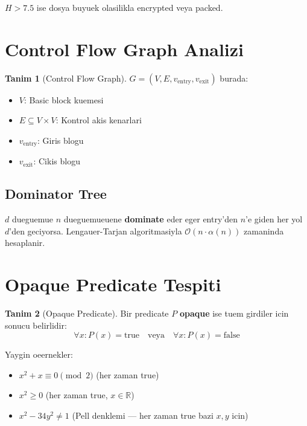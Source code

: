 \documentclass[12pt,a4paper,oneside]{book}
\theoremstyle{definition}
\newtheorem{definition}{Tanim}[chapter]
\newcommand{\bigO}[1]{\mathcal{O}\!\left(#1\right)}
\begin{document}
$H > 7.5$ ise dosya buyuek olasilikla encrypted veya packed.

\section{Control Flow Graph Analizi}
\label{sec:cfg}

\begin{definition}[Control Flow Graph]
$G = (V, E, v_{\text{entry}}, v_{\text{exit}})$ burada:
\begin{itemize}
\item $V$: Basic block kuemesi
\item $E \subseteq V \times V$: Kontrol akis kenarlari
\item $v_{\text{entry}}$: Giris blogu
\item $v_{\text{exit}}$: Cikis blogu
\end{itemize}
\end{definition}

\subsection{Dominator Tree}

$d$ dueguemue $n$ dueguemueuene \textbf{dominate} eder eger entry'den $n$'e giden her yol $d$'den geciyorsa. Lengauer-Tarjan algoritmasiyla $\bigO{n \cdot \alpha(n)}$ zamaninda hesaplanir.

\section{Opaque Predicate Tespiti}
\label{sec:opaque}

\begin{definition}[Opaque Predicate]
Bir predicate $P$ \textbf{opaque} ise tuem girdi\-ler icin sonucu belirlidir:
\begin{equation}
\forall x: P(x) = \text{true} \quad \text{veya} \quad \forall x: P(x) = \text{false}
\end{equation}
\end{definition}

Yaygin oeernekler:
\begin{itemize}
\item $x^2 + x \equiv 0 \pmod{2}$ (her zaman true)
\item $x^2 \geq 0$ (her zaman true, $x \in \mathbb{R}$)
\item $x^2 - 34y^2 \neq 1$ (Pell denklemi --- her zaman true bazi $x,y$ icin)
\end{itemize}
\end{document}
